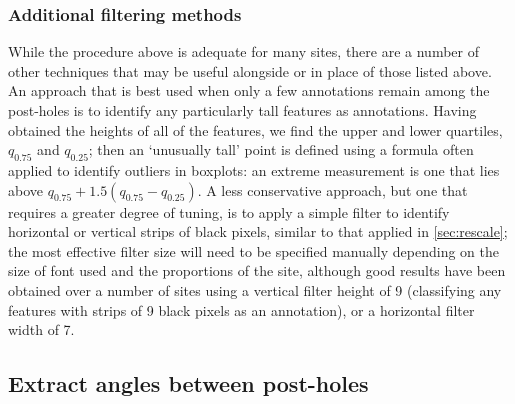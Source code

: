 \documentclass[../../ArchStats.tex]{subfiles}
\begin{document}





\subsubsection{Additional filtering methods}
\label{sec:alternative-techniques}

While the procedure above is adequate for many sites, there are a number of other techniques that may be useful alongside or in place of those listed above. An approach that is best used when only a few annotations remain among the post-holes is to identify any particularly tall features as annotations. Having obtained the heights of all of the features, we find the upper and lower quartiles, $q_{0.75}$ and $q_{0.25}$; then an `unusually tall' point is defined using a formula often applied to identify outliers in boxplots: an extreme measurement is one that lies above $q_{0.75} + 1.5(q_{0.75} - q_{0.25})$. A less conservative approach, but one that requires a greater degree of tuning, is to apply a simple filter to identify horizontal or vertical strips of black pixels, similar to that applied in \ref{sec:rescale}; the most effective filter size will need to be specified manually depending on the size of font used and the proportions of the site, although good results have been obtained over a number of sites using a vertical filter height of 9 (classifying any features with strips of 9 black pixels as an annotation), or a horizontal filter width of 7.

\subsection{Extract angles between post-holes}
\label{sec:posts-to-angles}
\end{document}
